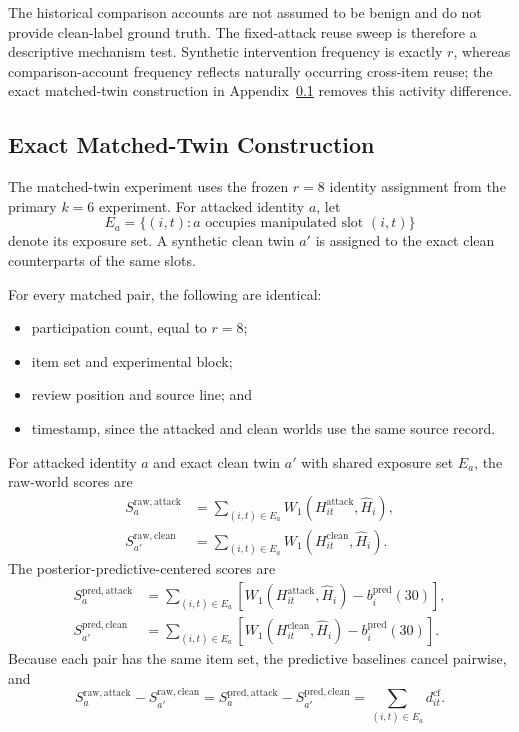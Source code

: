 The historical comparison accounts are not assumed to be benign and do not
provide clean-label ground truth. The fixed-attack reuse sweep is therefore
a descriptive mechanism test. Synthetic intervention frequency is exactly
$r$, whereas comparison-account frequency reflects naturally occurring
cross-item reuse; the exact matched-twin construction in
Appendix~\ref{sec:supp-twins}
removes this activity difference.


\subsection{Exact Matched-Twin Construction}
\label{sec:supp-twins}

The matched-twin experiment uses the frozen $r=8$ identity assignment from the primary $k=6$ experiment. For attacked identity $a$, let
\[
E_a
=
\{(i,t):a\text{ occupies manipulated slot }(i,t)\}
\]
denote its exposure set. A synthetic clean twin $a'$ is assigned to the exact
clean counterparts of the same slots.

For every matched pair, the following are identical:
\begin{itemize}
    \item participation count, equal to $r=8$;
    \item item set and experimental block;
    \item review position and source line; and
    \item timestamp, since the attacked and clean worlds use the same
    source record.
\end{itemize}

For attacked identity $a$ and exact clean twin $a'$ with shared exposure set
$E_a$, the raw-world scores are
\begin{align*}
S_a^{\mathrm{raw,attack}}
&=
\sum_{(i,t)\in E_a}
W_1\!\left(H_{it}^{\mathrm{attack}},\widehat H_i\right),\\
S_{a'}^{\mathrm{raw,clean}}
&=
\sum_{(i,t)\in E_a}
W_1\!\left(H_{it}^{\mathrm{clean}},\widehat H_i\right).
\end{align*}
The posterior-predictive-centered scores are
\begin{align*}
S_a^{\mathrm{pred,attack}}
&=
\sum_{(i,t)\in E_a}
\left[
W_1\!\left(H_{it}^{\mathrm{attack}},\widehat H_i\right)
-b_i^{\mathrm{pred}}(30)
\right],\\
S_{a'}^{\mathrm{pred,clean}}
&=
\sum_{(i,t)\in E_a}
\left[
W_1\!\left(H_{it}^{\mathrm{clean}},\widehat H_i\right)
-b_i^{\mathrm{pred}}(30)
\right].
\end{align*}
Because each pair has the same item set, the predictive baselines cancel
pairwise, and
\[
S_a^{\mathrm{raw,attack}}-S_{a'}^{\mathrm{raw,clean}}
=
S_a^{\mathrm{pred,attack}}-S_{a'}^{\mathrm{pred,clean}}
=
\sum_{(i,t)\in E_a} d_{it}^{\mathrm{cf}}.
\]

